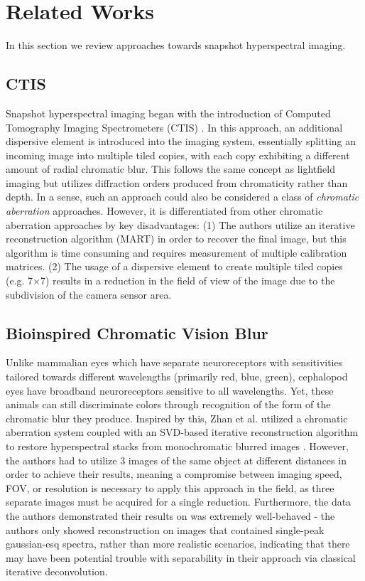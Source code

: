 \documentclass{article}
\begin{document}
\section{Related Works}
In this section we review approaches towards snapshot hyperspectral imaging.

\subsection{CTIS}
Snapshot hyperspectral imaging began with the introduction of Computed Tomography Imaging Spectrometers (CTIS) \cite{FORD2001986}. In this approach, an additional dispersive element is introduced into the imaging system, essentially splitting an incoming image into multiple tiled copies, with each copy exhibiting a different amount of radial chromatic blur. This follows the same concept as lightfield imaging \cite{guo2019fourier,broxton2013wave} but utilizes diffraction orders produced from chromaticity rather than depth. In a sense, such an approach could also be considered a class of \textit{chromatic aberration} approaches. However, it is differentiated from other chromatic aberration approaches by key disadvantages: (1) The authors utilize an iterative reconstruction algorithm (MART) in order to recover the final image, but this algorithm is time consuming and requires measurement of multiple calibration matrices. (2) The usage of a dispersive element to create multiple tiled copies (e.g. 7×7) results in a reduction in the field of view of the image due to the subdivision of the camera sensor area.

\subsection{Bioinspired Chromatic Vision Blur}
Unlike mammalian eyes which have separate neuroreceptors with sensitivities tailored towards different wavelengths (primarily red, blue, green), cephalopod eyes have broadband neuroreceptors sensitive to all wavelengths. Yet, these animals can still discriminate colors through recognition of the form of the chromatic blur they produce. Inspired by this, Zhan et al. utilized a chromatic aberration system coupled with an SVD-based iterative reconstruction algorithm to restore hyperspectral stacks from monochromatic blurred images \cite{zhan2019hyperspectral}. However, the authors had to utilize 3 images of the same object at different distances in order to achieve their results, meaning a compromise between imaging speed, FOV, or resolution is necessary to apply this approach in the field, as three separate images must be acquired for a single reduction. Furthermore, the data the authors demonstrated their results on was extremely well-behaved - the authors only showed reconstruction on images that contained single-peak gaussian-esq spectra, rather than more realistic scenarios, indicating that there may have been potential trouble with separability in their approach via classical iterative deconvolution.
\end{document}
